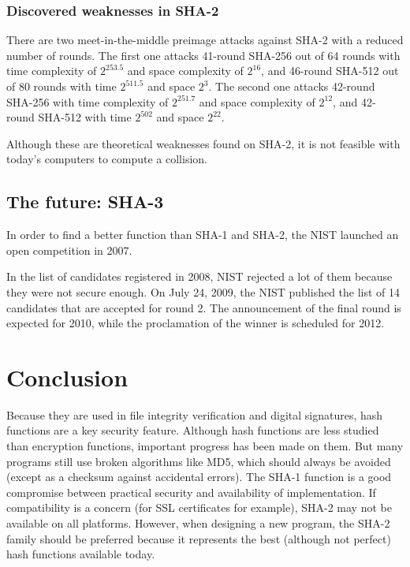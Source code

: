 \documentclass[12pt,a4paper]{article}
\begin{document}
\subsubsection{Discovered weaknesses in SHA-2}

There are two meet-in-the-middle preimage attacks against SHA-2 with a reduced number of rounds. The first one attacks 41-round SHA-256 out of 64 rounds with time complexity of $2^{253.5}$ and space complexity of $2^{16}$, and 46-round SHA-512 out of 80 rounds with time $2^{511.5}$ and space $2^3$. The second one attacks 42-round SHA-256 with time complexity of $2^{251.7}$ and space complexity of $2^{12}$, and 42-round SHA-512 with time $2^{502}$ and space $2^{22}$.

Although these are theoretical weaknesses found on SHA-2, it is not feasible with today's computers to compute a collision.

\subsection{The future: SHA-3}
In order to find a better function than SHA-1 and SHA-2, the NIST launched an open competition in 2007.

In the list of candidates registered in 2008, NIST rejected a lot of them because they were not secure enough. On July 24, 2009, the NIST published the list of 14 candidates that are accepted for round 2. The announcement of the final round is expected for 2010, while the proclamation of the winner is scheduled for 2012.

\section{Conclusion}
Because they are used in file integrity verification and digital signatures, hash functions are a key security feature. Although hash functions are less studied than encryption functions, important progress has been made on them. But many programs still use broken algorithms like MD5, which should always be avoided (except as a checksum against accidental errors). The SHA-1 function is a good compromise between practical security and availability of implementation. If compatibility is a concern (for SSL certificates for example), SHA-2 may not be available on all platforms. However, when designing a new program, the SHA-2 family should be preferred because it represents the best (although not perfect) hash functions available today.






\end{document}
